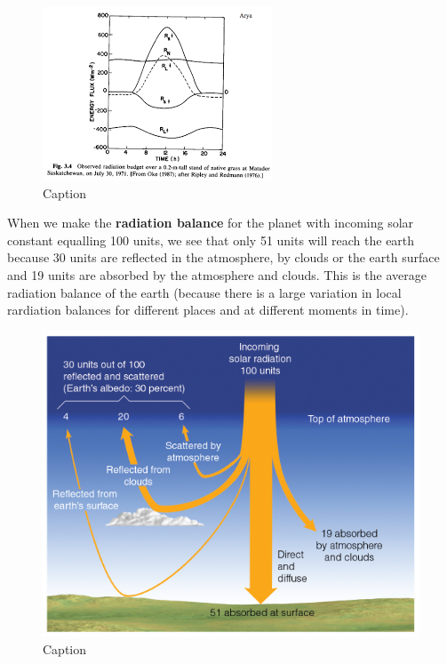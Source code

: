 \documentclass[oneside]{book}
\begin{document}
\begin{figure}

{\centering \includegraphics[width=0.9\linewidth]{figures/Figure137} 

}

\caption{Caption}\label{fig:RadiationCycle2}
\end{figure}

When we make the \textbf{radiation balance} for the planet with incoming
solar constant equalling 100 units, we see that only 51 units will reach
the earth because 30 units are reflected in the atmosphere, by clouds or
the earth surface and 19 units are absorbed by the atmosphere and
clouds. This is the average radiation balance of the earth (because
there is a large variation in local rardiation balances for different
places and at different moments in time).

\begin{figure}

{\centering \includegraphics[width=0.65\linewidth]{figures/Figure138} 

}

\caption{Caption}\label{fig:RadiationBal}
\end{figure}
\end{document}
